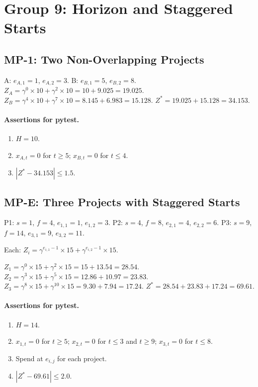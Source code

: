 \documentclass[11pt, a4paper]{article}
\begin{document}
\section{Group 9: Horizon and Staggered Starts}

\subsection{MP-1: Two Non-Overlapping Projects}

A: $e_{A,1}=1$, $e_{A,2}=3$. B: $e_{B,1}=5$, $e_{B,2}=8$.
$Z_A=\gamma^0\times10+\gamma^2\times10=10+9.025=19.025$.
$Z_B=\gamma^4\times10+\gamma^7\times10=8.145+6.983=15.128$.
$Z^*=19.025+15.128=\mathbf{34.153}$.

\paragraph{Assertions for pytest.}
\begin{enumerate}[label=A\arabic*.]
  \item $H=10$.
  \item $x_{A,t}=0$ for $t\geq5$; $x_{B,t}=0$ for $t\leq4$.
  \item $|Z^*-34.153|\leq1.5$.
\end{enumerate}

\subsection{MP-E: Three Projects with Staggered Starts}

P1: $s=1$, $f=4$, $e_{1,1}=1$, $e_{1,2}=3$.
P2: $s=4$, $f=8$, $e_{2,1}=4$, $e_{2,2}=6$.
P3: $s=9$, $f=14$, $e_{3,1}=9$, $e_{3,2}=11$.

Each: $Z_i = \gamma^{e_{i,1}-1}\times15 + \gamma^{e_{i,2}-1}\times15$.

$Z_1=\gamma^0\times15+\gamma^2\times15=15+13.54=28.54$.
$Z_2=\gamma^3\times15+\gamma^5\times15=12.86+10.97=23.83$.
$Z_3=\gamma^8\times15+\gamma^{10}\times15=9.30+7.94=17.24$.
$Z^*=28.54+23.83+17.24=\mathbf{69.61}$.

\paragraph{Assertions for pytest.}
\begin{enumerate}[label=A\arabic*.]
  \item $H=14$.
  \item $x_{1,t}=0$ for $t\geq5$; $x_{2,t}=0$ for $t\leq3$ and $t\geq9$;
    $x_{3,t}=0$ for $t\leq8$.
  \item Spend at $e_{i,j}$ for each project.
  \item $|Z^*-69.61|\leq2.0$.
\end{enumerate}
\end{document}
